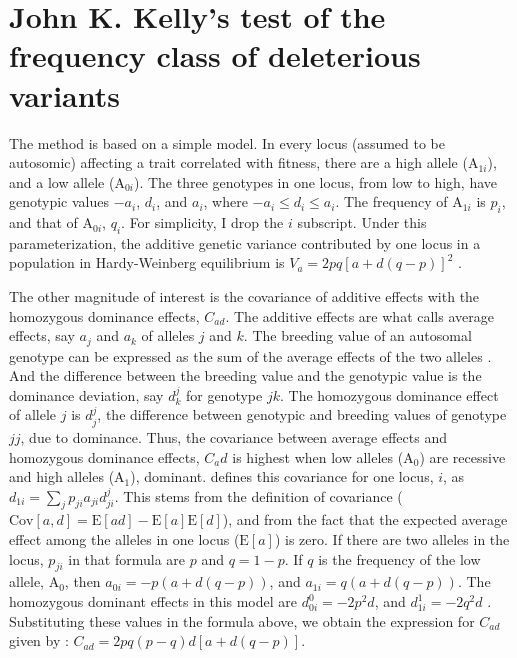 \documentclass[a4paper,12pt]{article}
\begin{document}
\section{John K. Kelly's test of the frequency class of deleterious variants}\label{sec:autosomic}
The method is based on a simple model. In every locus (assumed to be autosomic) affecting a trait correlated with fitness, there are a high allele (A$_{1i}$), and a low allele (A$_{0i}$). The three genotypes in one locus, from low to high, have genotypic values $-a_i$, $d_i$, and $a_i$, where $-a_i \leqslant d_i \leqslant a_i$. The frequency of A$_{1i}$ is $p_i$, and that of A$_{0i}$, $q_i$. For simplicity, I drop the $i$ subscript. Under this parameterization, the additive genetic variance contributed by one locus in a population in Hardy-Weinberg equilibrium is $V_a=2pq[a+d(q-p)]^2$ \citet[p. 126]{Falconer1989}.

The other magnitude of interest is the covariance of additive effects with the homozygous dominance effects, $C_{ad}$. The additive effects are what \citet[p. 112]{Falconer1989} calls average effects, say $a_j$ and $a_k$ of alleles $j$ and $k$. The breeding value of an autosomal genotype can be expressed as the sum of the average effects of the two alleles \citep[p.115]{Falconer1989}. And the difference between the breeding value and the genotypic value is the dominance deviation, say $d^j_k$ for genotype $jk$. The homozygous dominance effect of allele $j$ is $d^j_j$, the difference between genotypic and breeding values of genotype $jj$, due to dominance. Thus, the covariance between average effects and homozygous dominance effects, $C_ad$ is highest when low alleles (A$_0$) are recessive and high alleles (A$_1$), dominant. \citet{Cockerham1984} defines this covariance for one locus, $i$, as $d_{1i}=\sum_j p_{ji}a_{ji}d^j_{ji}$. This stems from the definition of covariance ($\mathrm{Cov}[a, d]=\mathrm{E}[ad] - \mathrm{E}[a]\mathrm{E}[d]$), and from the fact that the expected average effect among the alleles in one locus ($\mathrm{E}[a]$) is zero. If there are two alleles in the locus, $p_{ji}$ in that formula are $p$ and $q = 1-p$. If $q$ is the frequency of the low allele, A$_0$, then $a_{0i} = -p(a+d(q-p))$, and $a_{1i} = q(a+d(q-p))$. The homozygous dominant effects in this model are $d^0_{0i} = -2p^2d$, and $d^1_{1i}=-2q^2d$ \citep[p. 118]{Falconer1989}. Substituting these values in the formula above, we obtain the expression for $C_{ad}$ given by \citet{Kelly1999}: $C_{ad}=2pq(p-q)d[a+d(q-p)]$.
\end{document}

